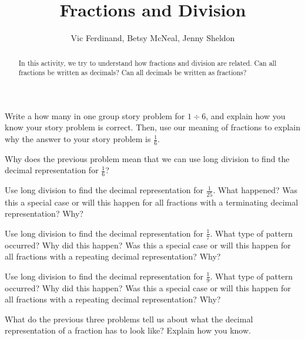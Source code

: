 \documentclass[noauthor, nooutcomes, handout]{ximera}
\title{Fractions and Division}
\author{Vic Ferdinand, Betsy McNeal, Jenny Sheldon}
\begin{document}
\begin{abstract} 
In this activity, we try to understand how fractions and division are related.  Can all fractions be written as decimals?  Can all decimals be written as fractions?
\end{abstract}
\maketitle



\begin{problem}
Write a how many in one group story problem for $1 \div 6$, and explain how you know your story problem is correct. Then, use our meaning of fractions to explain why the answer to your story problem is $\frac{1}{6}$.

\end{problem}

\begin{problem}
Why does the previous problem mean that we can use long division to find the decimal representation for $\frac{1}{6}$?
\end{problem}



\begin{problem}
Use long division to find the decimal representation for $\frac{1}{25}$. What happened? Was this a special case or will this happen for all fractions with a terminating decimal representation? Why?
\end{problem}



\begin{problem}
Use long division to find the decimal representation for $\frac{1}{7}$. What type of pattern occurred?  Why did this happen?  Was this a special case or will this happen for all fractions with a repeating decimal representation?  Why?
\end{problem}



\begin{problem}
Use long division to find the decimal representation for $\frac{1}{9}$. What type of pattern occurred?  Why did this happen?  Was this a special case or will this happen for all fractions with a repeating decimal representation?  Why?
\end{problem}



\begin{problem}
What do the previous three problems tell us about what the decimal representation of a fraction has to look like? Explain how you know. %
\end{problem}
\end{document}
